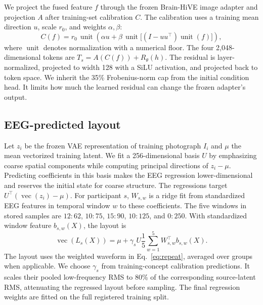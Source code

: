 \documentclass[letterpaper,10pt,conference]{IEEEtran}
\newcommand{\vect}{\operatorname{vec}}
\newcommand{\unit}{\operatorname{unit}}
\begin{document}
We project the fused feature \(f\) through the frozen Brain-HiVE image adapter and projection \(A\) after training-set calibration \(C\). The calibration uses a training mean direction \(u\), scale \(r_0\), and weights \(\alpha,\beta\):
\begin{equation}
C(f)=r_0\,\unit\!\left(\alpha u+
\beta\,\unit\big[(I-uu^\top)\unit(f)\big]\right),
\end{equation}
where \(\unit\) denotes normalization with a numerical floor. The four 2,048-dimensional tokens are \(T_s=A(C(f))+R_\theta(h)\). The residual is layer-normalized, projected to width 128 with a SiLU activation, and projected back to token space. We inherit the 35\% Frobenius-norm cap from the initial condition head. It limits how much the learned residual can change the frozen adapter's output.

\subsection{EEG-predicted layout}

Let \(z_i\) be the frozen VAE representation of training photograph \(I_i\) and \(\mu\) the mean vectorized training latent. We fit a 256-dimensional basis \(U\) by emphasizing coarse spatial components while computing principal directions of \(z_i-\mu\). Predicting coefficients in this basis makes the EEG regression lower-dimensional and reserves the initial state for coarse structure. The regressions target \(U^\top(\vect(z_i)-\mu)\). For participant \(s\), \(W_{s,w}\) is a ridge fit from standardized EEG features in temporal window \(w\) to these coefficients. The five windows in stored samples are \(12{:}62\), \(10{:}75\), \(15{:}90\), \(10{:}125\), and \(0{:}250\). With standardized window feature \(b_{s,w}(X)\), the layout is
\begin{equation}
\vect(L_s(X))=\mu+\gamma_s U\frac{1}{5}\sum_{w=1}^5 W_{s,w}^{\top}b_{s,w}(X).
\label{eq:layout}
\end{equation}
The layout uses the weighted waveform in Eq.~\eqref{eq:repeat}, averaged over groups when applicable. We choose \(\gamma_s\) from training-concept calibration predictions. It scales their pooled low-frequency RMS to 80\% of the corresponding source-latent RMS, attenuating the regressed layout before sampling. The final regression weights are fitted on the full registered training split.
\end{document}
